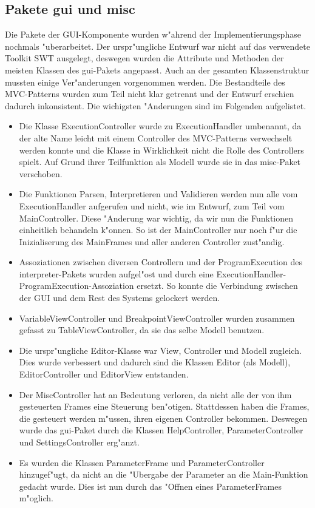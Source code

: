 \subsection{Pakete gui und misc}
Die Pakete der GUI-Komponente wurden w"ahrend der Implementierungsphase nochmals "uberarbeitet. Der urspr"ungliche Entwurf war nicht auf das verwendete Toolkit SWT ausgelegt, deswegen wurden die Attribute und Methoden der meisten Klassen des gui-Pakets angepasst. Auch an der gesamten Klassenstruktur mussten einige Ver"anderungen vorgenommen werden. Die Bestandteile des MVC-Patterns wurden zum Teil nicht klar getrennt und der Entwurf erschien dadurch inkonsistent. Die wichigsten "Anderungen sind im Folgenden aufgelistet. 
\begin{itemize}
\item Die Klasse ExecutionController wurde zu ExecutionHandler umbenannt, da der alte Name leicht mit einem Controller des MVC-Patterns verwechselt werden konnte und die Klasse in Wirklichkeit nicht die Rolle des Controllers spielt. Auf Grund ihrer Teilfunktion als Modell wurde sie in das misc-Paket verschoben.
\item Die Funktionen Parsen, Interpretieren und Validieren werden nun alle vom ExecutionHandler aufgerufen und nicht, wie im Entwurf, zum Teil vom MainController. Diese "Anderung war wichtig, da wir nun die Funktionen einheitlich behandeln k"onnen. So ist der MainController nur noch f"ur die Inizialiserung des MainFrames und aller anderen Controller zust"andig. 
\item Assoziationen zwischen diversen Controllern und der ProgramExecution des interpreter-Pakets wurden aufgel"ost und durch eine ExecutionHandler-ProgramExecution-Assoziation ersetzt. So konnte die Verbindung zwischen der GUI und dem Rest des Systems gelockert werden.
\item VariableViewController und BreakpointViewController wurden zusammen gefasst zu TableViewController, da sie das selbe Modell benutzen. 
\item Die urspr"ungliche Editor-Klasse war View, Controller und Modell zugleich. Dies wurde verbessert und dadurch sind die Klassen Editor (als Modell), EditorController und EditorView entstanden.
\item Der MiscController hat an Bedeutung verloren, da nicht alle der von ihm gesteuerten Frames eine Steuerung ben"otigen. Stattdessen haben die Frames, die gesteuert werden m"ussen, ihren eigenen Controller bekommen. Deswegen wurde das gui-Paket durch die Klassen HelpController, ParameterController und SettingsController erg"anzt.
\item Es wurden die Klassen ParameterFrame und ParameterController hinzugef"ugt, da nicht an die "Ubergabe der Parameter an die Main-Funktion gedacht wurde. Dies ist nun durch das "Offnen eines ParameterFrames m"oglich.
\end{itemize}